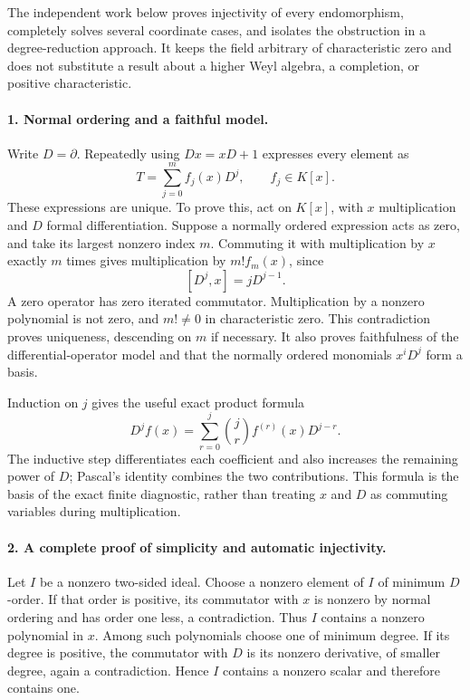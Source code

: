 \documentclass[11pt]{article}
\begin{document}
The independent work below proves injectivity of every endomorphism, completely solves several coordinate cases, and isolates the obstruction in a degree-reduction approach. It keeps the field arbitrary of characteristic zero and does not substitute a result about a higher Weyl algebra, a completion, or positive characteristic.

\paragraph{1. Normal ordering and a faithful model.}
Write $D=\partial$. Repeatedly using $Dx=xD+1$ expresses every element as
\[
 T=\sum_{j=0}^m f_j(x)D^j,\qquad f_j\in K[x].
\]
These expressions are unique. To prove this, act on $K[x]$, with $x$ multiplication and $D$ formal differentiation. Suppose a normally ordered expression acts as zero, and take its largest nonzero index $m$. Commuting it with multiplication by $x$ exactly $m$ times gives multiplication by $m!f_m(x)$, since
\[
 [D^j,x]=jD^{j-1}.
\]
A zero operator has zero iterated commutator. Multiplication by a nonzero polynomial is not zero, and $m!\ne0$ in characteristic zero. This contradiction proves uniqueness, descending on $m$ if necessary. It also proves faithfulness of the differential-operator model and that the normally ordered monomials $x^iD^j$ form a basis.

Induction on $j$ gives the useful exact product formula
\[
 D^j f(x)=\sum_{r=0}^j\binom jr f^{(r)}(x)D^{j-r}.
 \tag{336.1}
\]
The inductive step differentiates each coefficient and also increases the remaining power of $D$; Pascal's identity combines the two contributions. This formula is the basis of the exact finite diagnostic, rather than treating $x$ and $D$ as commuting variables during multiplication.

\paragraph{2. A complete proof of simplicity and automatic injectivity.}
Let $I$ be a nonzero two-sided ideal. Choose a nonzero element of $I$ of minimum $D$-order. If that order is positive, its commutator with $x$ is nonzero by normal ordering and has order one less, a contradiction. Thus $I$ contains a nonzero polynomial in $x$. Among such polynomials choose one of minimum degree. If its degree is positive, the commutator with $D$ is its nonzero derivative, of smaller degree, again a contradiction. Hence $I$ contains a nonzero scalar and therefore contains one.
\end{document}
